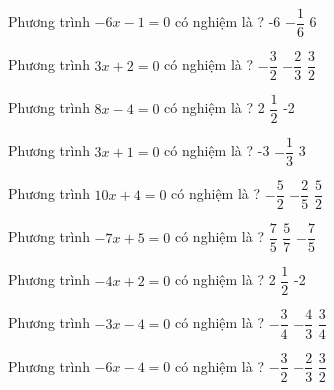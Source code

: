 \begin{ex} 
 Phương trình $-6x-1=0$ có nghiệm là ? 
 {-6} 
 {\True $- \dfrac{ 1 }{ 6 } $} 
 {6}  
 \loigiai{} 
 \end{ex} 
 
\begin{ex} 
 Phương trình $3x+2=0$ có nghiệm là ? 
 {$- \dfrac{ 3 }{ 2 } $} 
 {\True $- \dfrac{ 2 }{ 3 } $} 
 {$ \dfrac{ 3 }{ 2 } $}  
 \loigiai{} 
 \end{ex} 
 
\begin{ex} 
 Phương trình $8x-4=0$ có nghiệm là ? 
 {2} 
 {\True $ \dfrac{ 1 }{ 2 } $} 
 {-2}  
 \loigiai{} 
 \end{ex} 
 
\begin{ex} 
 Phương trình $3x+1=0$ có nghiệm là ? 
 {-3} 
 {\True $- \dfrac{ 1 }{ 3 } $} 
 {3}  
 \loigiai{} 
 \end{ex} 
 
\begin{ex} 
 Phương trình $10x+4=0$ có nghiệm là ? 
 {$- \dfrac{ 5 }{ 2 } $} 
 {\True $- \dfrac{ 2 }{ 5 } $} 
 {$ \dfrac{ 5 }{ 2 } $}  
 \loigiai{} 
 \end{ex} 
 
\begin{ex} 
 Phương trình $-7x+5=0$ có nghiệm là ? 
 {$ \dfrac{ 7 }{ 5 } $} 
 {\True $ \dfrac{ 5 }{ 7 } $} 
 {$- \dfrac{ 7 }{ 5 } $}  
 \loigiai{} 
 \end{ex} 
 
\begin{ex} 
 Phương trình $-4x+2=0$ có nghiệm là ? 
 {2} 
 {\True $ \dfrac{ 1 }{ 2 } $} 
 {-2}  
 \loigiai{} 
 \end{ex} 
 
\begin{ex} 
 Phương trình $-3x-4=0$ có nghiệm là ? 
 {$- \dfrac{ 3 }{ 4 } $} 
 {\True $- \dfrac{ 4 }{ 3 } $} 
 {$ \dfrac{ 3 }{ 4 } $}  
 \loigiai{} 
 \end{ex} 
 
\begin{ex} 
 Phương trình $-6x-4=0$ có nghiệm là ? 
 {$- \dfrac{ 3 }{ 2 } $} 
 {\True $- \dfrac{ 2 }{ 3 } $} 
 {$ \dfrac{ 3 }{ 2 } $}  
 \loigiai{} 
 \end{ex} 
 
